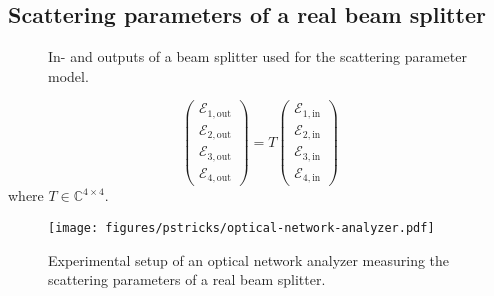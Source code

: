 \subsection{Scattering parameters of a real beam splitter}


\begin{figure}[htb]
    \centering
    
    \caption{In- and outputs of a beam splitter used for the scattering parameter model.}\label{fig:beam_splitter_scattering_parameters}
\end{figure}

\begin{equation}
    \begin{pmatrix}
        \mathcal{E}_{1,\text{out}} \\
        \mathcal{E}_{2,\text{out}} \\
        \mathcal{E}_{3,\text{out}} \\
        \mathcal{E}_{4,\text{out}}
    \end{pmatrix}
    =
    T
    \begin{pmatrix}
        \mathcal{E}_{1,\text{in}} \\
        \mathcal{E}_{2,\text{in}} \\
        \mathcal{E}_{3,\text{in}} \\
        \mathcal{E}_{4,\text{in}}
    \end{pmatrix}
\end{equation}
where $T\in\mathbb{C}^{4\times4}$.

\begin{figure}[htb]
    \centering
    \texttt{[image: figures/pstricks/optical-network-analyzer.pdf]}
    \caption{Experimental setup of an optical network analyzer measuring the scattering parameters of a real beam splitter.}\label{fig:beam_splitter_network_analyzer}
\end{figure}